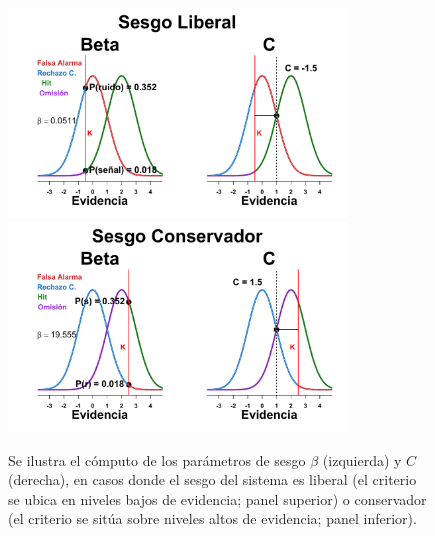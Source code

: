 \begin{itemize}
\begin{figure}[th]
\centering
\includegraphics[width=0.8\textwidth]{Figures/Graficador_Sesgo_LiberalR}\\
\includegraphics[width=0.8\textwidth]{Figures/Graficador_Sesgo_ConservadorR}\\
\caption[Estimación del sesgo con base en el criterio]{Se ilustra el cómputo de los parámetros de sesgo $\beta$ (izquierda) y $C$ (derecha), en casos donde el sesgo del sistema es liberal (el criterio se ubica en niveles bajos de evidencia; panel superior) o conservador (el criterio se sitúa sobre niveles altos de evidencia; panel inferior).}
\label{fig:Graf_Sesgo}
\end{figure}
\end{itemize}   %

